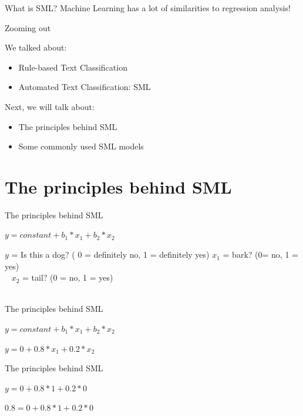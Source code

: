 \documentclass[compress]{beamer}
\begin{document}
\begin{frame}[fragile]{What is SML?} 
Machine Learning has a lot of similarities to regression analysis!
\end{frame}



\begin{frame}[fragile]{Zooming out} 
	
\begin{alertblock}{We talked about:}
\begin{itemize}
	\item Rule-based Text Classification
	\item Automated Text Classification: SML
\end{itemize}
\end{alertblock}
	
\begin{alertblock}{Next, we will talk about:}
\begin{itemize}
	\item The principles behind SML
	\item Some commonly used SML models
\end{itemize}
\end{alertblock}	
\end{frame}


\section{The principles behind SML}

\begin{frame}[fragile]{The principles behind SML} 
	
\(y = constant + b_1 * x_1 + b_2 * x_2\) 

\pause

\(y\) = Is this a dog? ( 0 = definitely no, 1 = definitely yes)
\pause
\(x_1\) = bark? (0= no, 1 = yes) \\\
\pause
\(x_2\) = tail? (0 = no, 1 = yes) \\\
	
\end{frame}

\begin{frame}[fragile]{The principles behind SML} 
	
\(y = constant + b_1 * x_1 + b_2 * x_2\)
\pause
	
\(y = 0 + 0.8 * x_1 + 0.2 * x_2\) 
\end{frame}


\begin{frame}[fragile]{The principles behind SML} 
	
\(y = 0 + 0.8 * 1 + 0.2 * 0\)
\pause
	
\(0.8 = 0 + 0.8 * 1 + 0.2 * 0\)
\end{frame}
\end{document}
